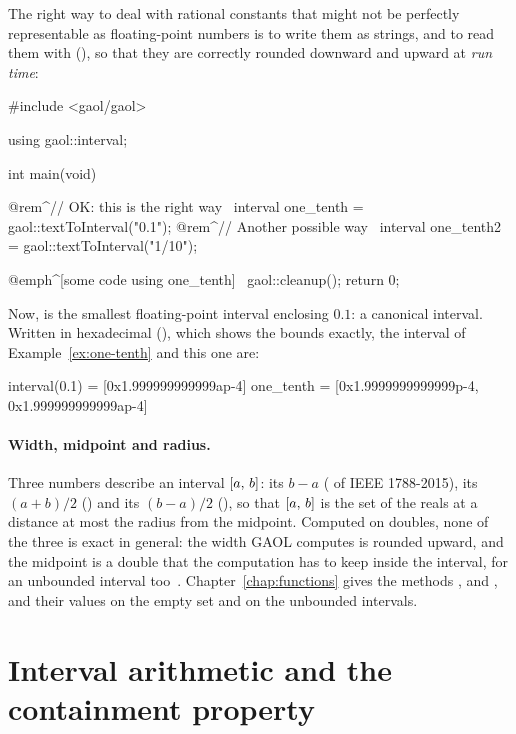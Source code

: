 \begin{Ex}\label{ex:one-tenth-right}
The right way to deal with rational constants that might not be perfectly
representable as floating-point numbers is to write them as strings, and to
read them with  (), so
that they are correctly rounded downward and upward at \emph{run time}:
\begin{example}
#include <gaol/gaol>

using gaol::interval;

int main(void)
{
  @rem^// OK: this is the right way~
  interval one_tenth = gaol::textToInterval("0.1");
  @rem^// Another possible way~
  interval one_tenth2 = gaol::textToInterval("1/10");

  @emph^[some code using one_tenth]~
  gaol::cleanup();
  return 0;
}
\end{example}
Now,  is the smallest floating-point interval enclosing
$0.1$: a canonical interval. Written in hexadecimal
(), which shows the bounds exactly, the interval of
Example~\ref{ex:one-tenth} and this one are:
\begin{onscreen}
interval(0.1) = [0x1.999999999999ap-4]
one_tenth     = [0x1.9999999999999p-4, 0x1.999999999999ap-4]
\end{onscreen}
\end{Ex}

\paragraph{Width, midpoint and radius.}
Three numbers describe an interval $[a,\,b]$: its  $b-a$
( of IEEE 1788-2015), its  $(a+b)/2$ ()
and its  $(b-a)/2$ (), so that $[a,\,b]$ is the
set of the reals at a distance at most the radius from the midpoint.
Computed on doubles, none of the three is exact in general: the width GAOL
computes is rounded upward, and the midpoint is a double that the
computation has to keep inside the interval, for an unbounded interval
too~\cite{Goualard:TOMS2014}. Chapter~\ref{chap:functions} gives the
methods ,  and , and their
values on the empty set and on the unbounded intervals.
%

\section{Interval arithmetic and the containment property}
\label{sec:containment}
%
%

